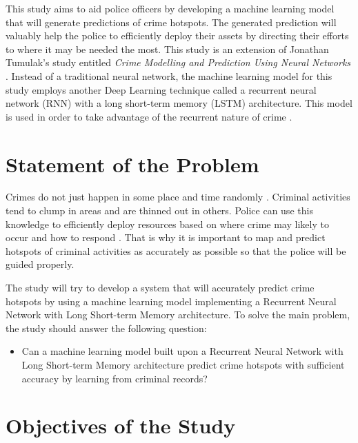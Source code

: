     This study aims to aid police officers by developing a machine learning model that will generate predictions of crime hotspots. The generated prediction will valuably help the police to efficiently deploy their assets by directing their efforts to where it may be needed the most. This study is an extension of Jonathan Tumulak's study entitled \textit{Crime Modelling and Prediction Using Neural Networks} \citeyearpar{tumulak2015crime}. Instead of a traditional neural network, the machine learning model for this study employs another Deep Learning technique called a recurrent neural network (RNN) with a long short-term memory (LSTM) architecture. This model is used in order to take advantage of the recurrent nature of crime \citep{perc2013understanding}.

\section{Statement of the Problem} %

    Crimes do not just happen in some place and time randomly \citep{brantingham2005modeling}. Criminal activities tend to clump in areas and are thinned out in others. Police can use this knowledge to efficiently deploy resources based on where crime may likely to occur and how to respond \citep{eck2005mapping}. That is why it is important to map and predict hotspots of criminal activities as accurately as possible so that the police will be guided properly.

    The study will try to develop a system that will accurately predict crime hotspots by using a machine learning model implementing a Recurrent Neural Network with Long Short-term Memory architecture. To solve the main problem, the study should answer the following question:
        \begin{itemize}
        \item Can a machine learning model built upon a Recurrent Neural Network with Long Short-term Memory architecture predict crime hotspots with sufficient accuracy by learning from criminal records?
        \end{itemize}

\section{Objectives of the Study} %

